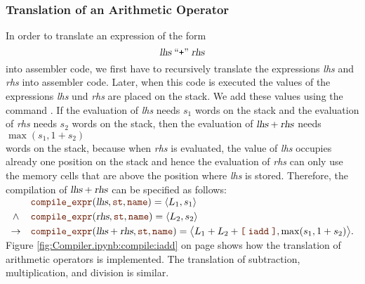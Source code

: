 \subsubsection{Translation of an Arithmetic Operator}
In order to translate an expression of the form
\[ \textsl{lhs} \;\mbox{``\texttt{+}''}\; \textsl{rhs} \]
into assembler code, we first have to recursively translate the expressions \textsl{lhs} and
\textsl{rhs} into assembler code.  Later, when this code is executed the values of the expressions
\textsl{lhs} und \textsl{rhs} are placed on the stack.  We add these values using the command .
If the evaluation of \textsl{lhs} needs $s_1$ words on the stack and the evaluation of \textsl{rhs} needs $s_2$
words on the stack, then the evaluation of $\textsl{lhs} + \textsl{rhs}$ needs 
\\[0.2cm]
\hspace*{1.3cm}
$\max(s_1, 1 + s_2)$
\\[0.2cm]
words on the stack, because when \textsl{rhs} is evaluated, the value of \textsl{lhs} occupies already one position
on the stack and hence the evaluation of \textsl{rhs} can only use the memory cells that are above the position
where \textsl{lhs} is stored. Therefore, the compilation of $\textsl{lhs} + \textsl{rhs}$ can be specified as
follows:
\\[0.2cm]
\hspace*{1.3cm}
$
\begin{array}[t]{cll}
        & \mytt{compile\_expr}(\textsl{lhs}, \mytt{st}, \mytt{name}) = \pair(L_1, s_1)  \\[0.1cm]
\wedge  & \mytt{compile\_expr}(\textsl{rhs}, \mytt{st}, \mytt{name}) = \pair(L_2, s_2)  \\[0.1cm]
\rightarrow & \mytt{compile\_expr}(\textsl{lhs} + \textsl{rhs}, \mytt{st}, \mytt{name}) = 
            \bigl\langle L_1 + L_2 + \mytt{[}\; \mytt{iadd} \;\mytt{]}, \max(s_1, 1+s_2) \bigr\rangle.
\end{array}$
\\[0.2cm]
Figure \ref{fig:Compiler.ipynb:compile:iadd} on page \pageref{fig:Compiler.ipynb:compile:iadd} shows how the
translation of arithmetic operators is implemented.  The translation of subtraction, multiplication, and
division is similar.

